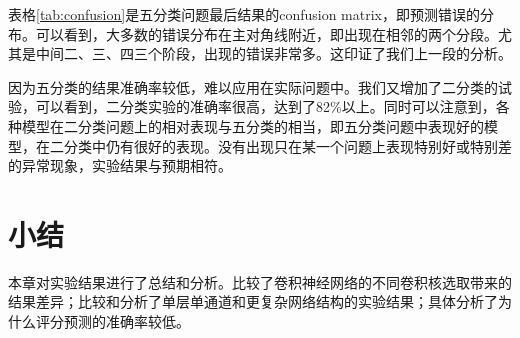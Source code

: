 表格\ref{tab:confusion}是五分类问题最后结果的confusion matrix，即预测错误的分布。可以看到，大多数的错误分布在主对角线附近，即出现在相邻的两个分段。尤其是中间二、三、四三个阶段，出现的错误非常多。这印证了我们上一段的分析。

因为五分类的结果准确率较低，难以应用在实际问题中。我们又增加了二分类的试验，可以看到，二分类实验的准确率很高，达到了82\%以上。同时可以注意到，各种模型在二分类问题上的相对表现与五分类的相当，即五分类问题中表现好的模型，在二分类中仍有很好的表现。没有出现只在某一个问题上表现特别好或特别差的异常现象，实验结果与预期相符。

\section{小结}
本章对实验结果进行了总结和分析。比较了卷积神经网络的不同卷积核选取带来的结果差异；比较和分析了单层单通道和更复杂网络结构的实验结果；具体分析了为什么评分预测的准确率较低。

